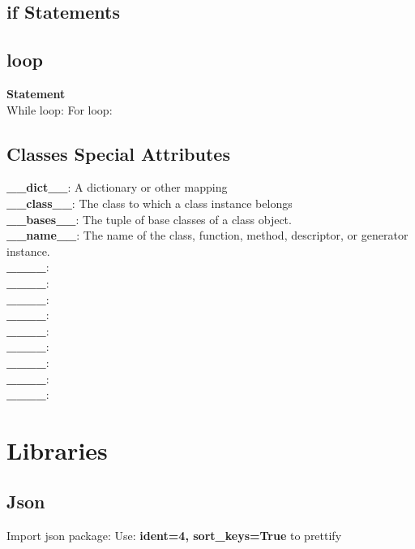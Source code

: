 \documentclass{cheatsheet}
\begin{document}
    \subsection{if Statements}
    
    \subsection{loop}
    \textbf{Statement} \\
    \vspace{0.1cm}
    While loop:
    \vspace{0.1cm}
    For loop:

    \subsection{Classes Special Attributes}
    \textbf{\_\_dict\_\_}: A dictionary or other mapping \\
    \textbf{\_\_class\_\_}: The class to which a class instance belongs \\
    \textbf{\_\_bases\_\_}: The tuple of base classes of a class object.\\
    \textbf{\_\_name\_\_}: The name of the class, function, method, descriptor, or generator instance.\\
    \textbf{\_\_\_\_}: \\
    \textbf{\_\_\_\_}: \\
    \textbf{\_\_\_\_}: \\
    \textbf{\_\_\_\_}: \\
    \textbf{\_\_\_\_}: \\
    \textbf{\_\_\_\_}: \\
    \textbf{\_\_\_\_}: \\
    \textbf{\_\_\_\_}: \\
    \textbf{\_\_\_\_}: \\

\section{Libraries}
    \subsection{Json}
        Import json package:
        Use: \textbf{ident=4, sort\_keys=True} to prettify
\end{document}
